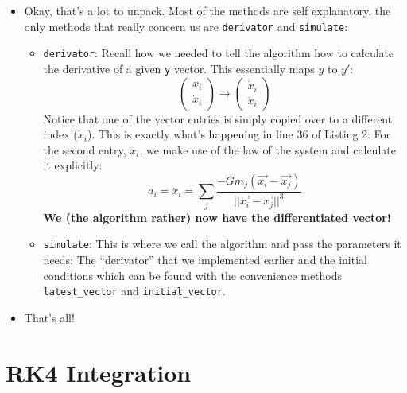 \documentclass[11pt]{article}
\newcommand{\psubsection}[1]{{\section*{\LARGE #1}}}
\begin{document}
    \begin{itemize}
        \item Okay, that's a lot to unpack. Most of the methods are self explanatory, the only methods that really concern us are \texttt{derivator} and \texttt{simulate}:
        \begin{itemize}
            \item \texttt{derivator}: Recall how we needed to tell the algorithm how to calculate the derivative of a given \texttt{y} vector. This essentially maps $y$ to $y'$:
            \[ \begin{pmatrix} x_i \\ \dot{x}_i \end{pmatrix} \rightarrow \begin{pmatrix} \dot{x}_i \\ \ddot{x}_i \end{pmatrix} \]
            Notice that one of the vector entries is simply copied over to a different index ($\dot{x}_i$). This is exactly what's happening in line 36 of Listing 2. For the second entry, $\ddot{x}_i$, we make use of the law of the system and calculate it explicitly:
            \[ a_i = \ddot{x}_i = \sum_{j}^{} \frac{-G m_j (\vec{x_i} - \vec{x_j})}{||\vec{x_i} - \vec{x_j}||^3}  \]
            \textbf{We (the algorithm rather) now have the differentiated vector!}
            \item \texttt{simulate}: This is where we call the algorithm and pass the parameters it needs: The ``derivator'' that we implemented earlier and the initial conditions which can be found with the convenience methods \texttt{latest\_vector} and \texttt{initial\_vector}.
        \end{itemize}
        \item That's all!
    \end{itemize}
    
    \psubsection{RK4 Integration}
\end{document}
